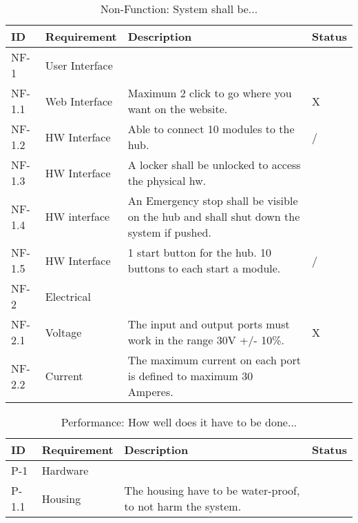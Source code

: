 \begin{table}[H]
	\begin{tabular} [b] {| p{1.1cm} |  p{2.5cm} | p{11.0cm} | p{1.0cm} |}
	\hline
	\textbf{ID} & \textbf{Requirement} & \textbf{Description} & Status\\\hline
		NF-1 & User Interface 	& ~  & ~ \\ \hline
		NF-1.1 & Web Interface 	& Maximum 2 click to go where you want on the website. & X \\ \hline
		NF-1.2 & HW Interface	& Able to connect 10 modules to the hub. & / \\ \hline
		NF-1.3 & HW Interface	& A locker shall be unlocked to access the physical hw. & ~ \\ \hline
		NF-1.4 & HW interface	& An Emergency stop shall be visible on the hub and shall shut down the system if pushed. & ~ \\ \hline
		NF-1.5 & HW Interface	& 1 start button for the hub. 10 buttons to each start a module. & / \\ \hline
		NF-2 & Electrical 		& ~ & ~ \\ \hline
		NF-2.1 & Voltage 		& The input and output ports must work in the range 30V +/-  10\%. & X \\ \hline
		NF-2.2 & Current 		& The maximum current on each port is defined to maximum 30 Amperes. & ~ \\ \hline
	\end{tabular}
	\caption{Non-Function: System shall be...}
\end{table}
\begin{table}[H]
	\begin{tabular} [b] {| p{1.1cm} |  p{2.5cm} | p{11.0cm} | p{1.0cm} |}
	\hline
	\textbf{ID} & \textbf{Requirement} & \textbf{Description} & Status\\\hline
		P-1 & Hardware 		&  ~ & ~ \\ \hline
		P-1.1 & Housing 		& The housing have to be water-proof, to not harm the system. & ~ \\ \hline
	\end{tabular}
	\caption{Performance: How well does it have to be done...}
\end{table}
